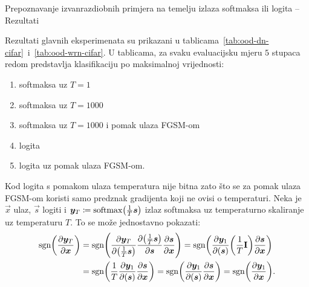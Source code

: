 \documentclass{beamer}
\begin{document}
\begin{frame}[allowframebreaks=0.9]{Prepoznavanje izvanrazdiobnih primjera na temelju izlaza softmaksa ili logita -- Rezultati}

Rezultati glavnih eksperimenata su prikazani u tablicama~\ref{tab:ood-dn-cifar}~i~\ref{tab:ood-wrn-cifar}. U tablicama, za svaku evaluacijsku mjeru $5$ stupaca redom predstavlja klasifikaciju po maksimalnoj vrijednosti:
\begin{enumerate}
	\item softmaksa uz $T=1$
	\item softmaksa uz $T=1000$ %
	\item softmaksa uz $T=1000$ i pomak ulaza FGSM-om
	\item logita
	\item logita uz pomak ulaza FGSM-om.
\end{enumerate}
Kod logita s pomakom ulaza temperatura nije bitna zato što se za pomak ulaza FGSM-om koristi samo predznak gradijenta koji ne ovisi o temperaturi. Neka je $\vec x$ ulaz, $\vec s$ logiti i $\vec y_T \coloneqq \softmax\del{\frac{1}{T}\vec s}$ izlaz softmaksa uz temperaturno skaliranje uz temperaturu $T$. To se može jednostavno pokazati:
\begin{align*}
\sgn\del{ \pd{\vec y_T}{\vec x} }
&= \sgn\del{ \pd{\vec y_T}{\del{\frac{1}{T}\vec s}} \pd{\del{\frac{1}{T}\vec s}}{\vec s} \pd{\vec s}{\vec x}  } 
= \sgn\del{ \pd{\vec y_1}{\del{\vec s}} \del{\frac{1}{T}\cvec I} \pd{\vec s}{\vec x} } \\
&= \sgn\del{ \frac{1}{T} \pd{\vec y_1}{\del{\vec s}} \pd{\vec s}{\vec x}  }
= \sgn\del{ \pd{\vec y_1}{\del{\vec s}} \pd{\vec s}{\vec x}  } 
= \sgn\del{ \pd{\vec y_1}{\vec x}  } \text{.}
\end{align*}


\end{frame}
\end{document}
